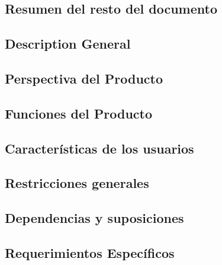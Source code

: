 \documentclass{report}
\begin{document}
        \subsection*{Resumen del resto del documento}


    \newpage

    \begin{center}
        \section*{Description General}
    \end{center}

        \subsection*{Perspectiva del Producto}

        \subsection*{Funciones del Producto}

        \subsection*{Características de los usuarios}

        \subsection*{Restricciones generales}

        \subsection*{Dependencias y suposiciones}

    \newpage
    
    \begin{center}
        \section*{Requerimientos Específicos}
    \end{center}

    \vspace{0.5cm}
\end{document}

